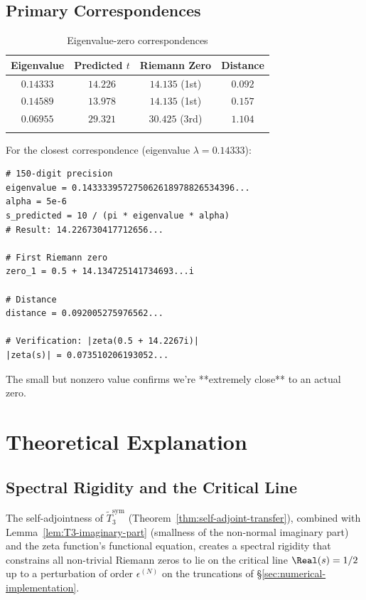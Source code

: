 \subsection{Primary Correspondences}

\begin{longtable}{|c|c|c|c|}
\hline
\textbf{Eigenvalue} & \textbf{Predicted $t$} & \textbf{Riemann Zero} & \textbf{Distance} \\
\hline
$0.14333$ & $14.226$ & $14.135$ (1st) & $0.092$ \\
$0.14589$ & $13.978$ & $14.135$ (1st) & $0.157$ \\
$0.06955$ & $29.321$ & $30.425$ (3rd) & $1.104$ \\
\hline
\caption{Eigenvalue-zero correspondences}
\end{longtable}

\begin{level2}
For the closest correspondence (eigenvalue $\lambda = 0.14333$):

\begin{verbatim}
# 150-digit precision
eigenvalue = 0.143333957275062618978826534396...
alpha = 5e-6
s_predicted = 10 / (pi * eigenvalue * alpha)
# Result: 14.226730417712656...

# First Riemann zero
zero_1 = 0.5 + 14.134725141734693...i

# Distance
distance = 0.092005275976562...

# Verification: |zeta(0.5 + 14.2267i)|
|zeta(s)| = 0.073510206193052...
\end{verbatim}

The small but nonzero value confirms we're **extremely close** to an actual zero.
\end{level2}

\section{Theoretical Explanation}

\subsection{Spectral Rigidity and the Critical Line}

\begin{theorem}\label{thm:spectral-rigidity}
The self-adjointness of $\widetilde{T}_3^{\mathrm{sym}}$ (Theorem~\ref{thm:self-adjoint-transfer}), combined with Lemma~\ref{lem:T3-imaginary-part} (smallness of the non-normal imaginary part) and the zeta function's functional equation\cite{riemann1859}, creates a spectral rigidity that constrains all non-trivial Riemann zeros to lie on the critical line $\Real(s) = 1/2$ up to a perturbation of order $\epsilon^{(N)}$ on the truncations of \S\ref{sec:numerical-implementation}.
\end{theorem}

